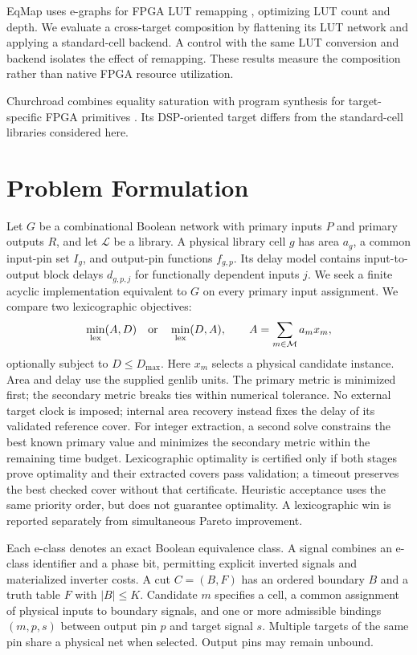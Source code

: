 \documentclass[conference]{IEEEtran}
\begin{document}
EqMap uses e-graphs for FPGA LUT remapping \cite{eqmap}, optimizing LUT
count and depth. We evaluate a cross-target composition by flattening its
LUT network and applying a standard-cell backend. A control with the same
LUT conversion and backend isolates the effect of remapping. These results
measure the composition rather than native FPGA resource utilization.

Churchroad combines equality saturation with program synthesis for
target-specific FPGA primitives \cite{churchroad}. Its DSP-oriented target
differs from the standard-cell libraries considered here.

\section{Problem Formulation}
Let $G$ be a combinational Boolean network with primary inputs $P$ and
primary outputs $R$, and let $\mathcal{L}$ be a library. A physical library
cell $g$ has area $a_g$, a common input-pin set $I_g$, and output-pin
functions $f_{g,p}$. Its delay model contains input-to-output block delays
$d_{g,p,j}$ for functionally dependent inputs $j$.
We seek a finite acyclic implementation equivalent to $G$ on every primary
input assignment. We compare two lexicographic objectives:
\begin{equation}
  \min_{\rm lex}(A,D)\quad\text{or}\quad\min_{\rm lex}(D,A),\qquad
  A=\sum_{m\in\mathcal{M}}a_m x_m,
  \label{eq:objective}
\end{equation}
optionally subject to $D\leq D_{\max}$. Here $x_m$ selects a physical
candidate instance. Area and delay use the supplied genlib units.
The primary metric is minimized first; the secondary metric breaks ties
within numerical tolerance. No external target clock is imposed; internal area recovery instead fixes
the delay of its validated reference cover.
For integer extraction, a second solve constrains the best known primary
value and minimizes the secondary metric within the remaining time budget.
Lexicographic optimality is certified only if both stages prove optimality
and their extracted covers pass validation; a timeout preserves the best
checked cover without that certificate. Heuristic acceptance uses the same
priority order, but does not guarantee optimality. A lexicographic win is
reported separately from simultaneous Pareto improvement.

Each e-class denotes an exact Boolean equivalence class. A signal combines
an e-class identifier and a phase bit, permitting explicit inverted signals
and materialized inverter costs. A cut $C=(B,F)$ has an ordered boundary
$B$ and a truth table $F$ with $|B|\leq K$. Candidate $m$ specifies a cell,
a common assignment of physical inputs to boundary signals, and one or
more admissible bindings $(m,p,s)$ between output pin $p$ and target signal
$s$. Multiple targets of the same pin share a physical net when selected.
Output pins may remain unbound.
\end{document}
